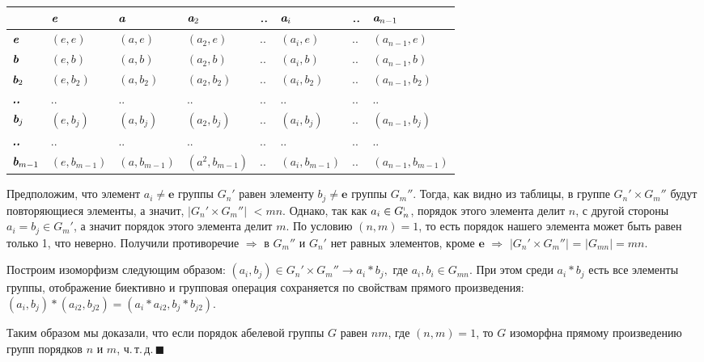 \documentclass[12pt,a4paper]{article}
\newcommand{\ve}{\boldsymbol{e}}
\begin{document}
\begin{center}
\begin{tabular}{|l|l|l|l|l|l|l|l|}
\hline
$ $ & $\textit{\textbf{e}}$ & $\textit{\textbf{a}}$ & $\textit{\textbf{a}}_2$ & $\textit{\textbf{..}}$ & $\textit{\textbf{a}}_i$ & $\textit{\textbf{..}}$ & $\textit{\textbf{a}}_{n-1}$\\
\hline
$\textit{\textbf{e}}$ & $(e,e)$ & $(a,e)$ & $(a_2,e)$ & $..$ & $(a_i,e)$ & $..$ & $(a_{n-1},e)$\\
\hline
$\textit{\textbf{b}}$ & $(e,b)$ & $(a,b)$ & $(a_2,b)$ & $..$ & $(a_i,b)$ & $..$ & $(a_{n-1},b)$\\
\hline
$\textit{\textbf{b}}_2$ & $(e,b_2)$ & $(a,b_2)$ & $(a_2,b_2)$ & $..$ & $(a_i,b_2)$ & $..$ & $(a_{n-1},b_2)$\\
\hline
$\textit{\textbf{..}}$ & $..$ & $..$ & $..$ & $..$ & $..$ & $..$ & $..$\\
\hline
$\textit{\textbf{b}}_j$ & $(e,b_j)$ & $(a,b_j)$ & $(a_2,b_j)$ & $..$ & $(a_i,b_j)$ & $..$ & $(a_{n-1},b_j)$\\
\hline
$\textit{\textbf{..}}$ & $..$ & $..$ & $..$ & $..$ & $..$ & $..$ & $..$\\
\hline
$\textit{\textbf{b}}_{m-1}$ & $(e,b_{m-1})$ & $(a,b_{m-1})$ & $(a^2,b_{m-1})$ & $..$ & $(a_i,b_{m-1})$ & $..$ & $(a_{n-1},b_{m-1})$\\
\hline
\end{tabular}
\end{center}


Предположим, что элемент $a_i\neq \ve$ группы $G_n' $ равен элементу $b_j \neq \ve$ группы $G_m''$. Тогда, как видно из таблицы, в группе $G_n' \times G_m''$ будут повторяющиеся элементы, а значит, $|G_n' \times G_m''|$ $< mn$. Однако, так как $a_i \in G_n^ \shortmid$, порядок этого элемента делит $n$, с другой стороны $a_i=b_j \in G_m'$, а значит порядок этого элемента делит $m$. По условию $(n,m)=1$, то есть порядок нашего элемента может быть равен только 1, что неверно. Получили противоречие $\Rightarrow$ в  $G_m''$ и $G_n'$ нет равных элементов, кроме $\ve$ $\Rightarrow$ $|G_n' \times G_m''|$ = $|G_{mn}| = mn.$

Построим изоморфизм следующим образом: $(a_i,b_j) \in G_n' \times G_m'' \longrightarrow a_i \ast b_j,$ где $a_i, b_i \in G_{mn}$. При этом среди $a_i\ast b_j$ есть все элементы группы, отображение биективно и групповая операция сохраняется по свойствам прямого произведения: $(a_i,b_j)\ast (a_{i2},b_{j2})=(a_i \ast a_{i2}, b_j \ast b_{j2}).$


Таким образом мы доказали, что если порядок абелевой группы $G$ равен $nm$, где $(n,m) = 1$, то $G$ изоморфна прямому произведению групп порядков $n$ и $m$, ч.\,т.\,д.\,$\blacksquare$
\end{document}
